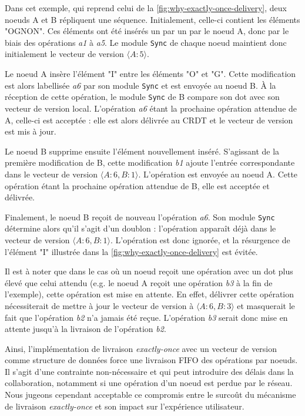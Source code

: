 \documentclass[12pt]{thesul}
\newcommand{\eg}{e.g. }
\begin{document}
Dans cet exemple, qui reprend celui de la \autoref{fig:why-exactly-once-delivery}, deux noeuds A et B répliquent une séquence.
Initialement, celle-ci contient les éléments "OGNON".
Ces éléments ont été insérés un par un par le noeud A, donc par le biais des opérations \emph{a1} à \emph{a5}.
Le module \texttt{Sync} de chaque noeud maintient donc initialement le vecteur de version $\langle A:5 \rangle$.

Le noeud A insère l'élément "I" entre les éléments "O" et "G".
Cette modification est alors labellisée \emph{a6} par son module \texttt{Sync} et est envoyée au noeud B.
À la réception de cette opération, le module \texttt{Sync} de B compare son dot avec son vecteur de version local.
L'opération \emph{a6} étant la prochaine opération attendue de A, celle-ci est acceptée : elle est alors délivrée au \ac{CRDT} et le vecteur de version est mis à jour.

Le noeud B supprime ensuite l'élément nouvellement inséré.
S'agissant de la première modification de B, cette modification \emph{b1} ajoute l'entrée correspondante dans le vecteur de version $\langle A:6, B:1 \rangle$.
L'opération est envoyée au noeud A.
Cette opération étant la prochaine opération attendue de B, elle est acceptée et délivrée.

Finalement, le noeud B reçoit de nouveau l'opération \emph{a6}.
Son module \texttt{Sync} détermine alors qu'il s'agit d'un doublon : l'opération apparaît déjà dans le vecteur de version $\langle A:6, B:1 \rangle$.
L'opération est donc ignorée, et la résurgence de l'élément "I" illustrée dans la \autoref{fig:why-exactly-once-delivery} est évitée.

Il est à noter que dans le cas où un noeud reçoit une opération avec un dot plus élevé que celui attendu (\eg le noeud A reçoit une opération \emph{b3} à la fin de l'exemple), cette opération est mise en attente.
En effet, délivrer cette opération nécessiterait de mettre à jour le vecteur de version à $\langle A:6,B:3 \rangle$ et masquerait le fait que l'opération \emph{b2} n'a jamais été reçue.
L'opération \emph{b3} serait donc mise en attente jusqu'à la livraison de l'opération \emph{b2}.

Ainsi, l'implémentation de livraison \emph{exactly-once} avec un vecteur de version comme structure de données force une livraison \ac{FIFO} des opérations par noeuds.
Il s'agit d'une contrainte non-nécessaire et qui peut introduire des délais dans la collaboration, notamment si une opération d'un noeud est perdue par le réseau.
Nous jugeons cependant acceptable ce compromis entre le surcoût du mécanisme de livraison \emph{exactly-once} et son impact sur l'expérience utilisateur.
\end{document}
